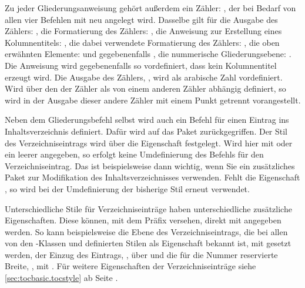 Zu jeder Gliederungsanweisung gehört außerdem ein Zähler: , der
bei Bedarf von allen vier Befehlen mit  neu angelegt
wird. Dasselbe gilt für die Ausgabe des Zählers: , die
Formatierung des Zählers: , die Anweisung zur
Erstellung eines Kolumnentitels: , die dabei
verwendete Formatierung des Zählers: , die oben
erwähnten Elemente:  und gegebenenfalls
, die nummerische Gliederungsebene:
. Die Anweisung  wird
gegebenenfalls so vordefiniert, dass kein Kolumnentitel erzeugt wird. Die
Ausgabe des Zählers, , wird als arabische Zahl
vordefiniert. Wird über den   der
Zähler als von einem anderen Zähler abhängig definiert, so wird in der Ausgabe
dieser andere Zähler mit einem Punkt getrennt vorangestellt.

Neben dem Gliederungsbefehl selbst wird auch ein Befehl für
einen Eintrag ins Inhaltsverzeichnis definiert. Dafür wird auf das Paket
\hyperref[cha:tocbasic]{}%
zurückgegriffen. Der Stil des Verzeichniseintrags wird über die Eigenschaft
 festgelegt. Wird hier mit  oder
 ein leerer  angegeben, so erfolgt
keine Umdefinierung des Befehls für den Verzeichniseintrag. Das ist
beispielsweise dann wichtig, wenn Sie ein zusätzliches Paket zur Modifikation
des Inhaltsverzeichnisses verwenden. Fehlt die Eigenschaft ,
so wird bei der Umdefinierung der bisherige Stil erneut verwendet.

Unterschiedliche Stile für Verzeichniseinträge haben
unterschiedliche zusätzliche Eigenschaften. Diese können, mit dem Präfix
 versehen, direkt mit angegeben werden. So kann beispielsweise die
Ebene des Verzeichniseintrags, die bei allen von den \KOMAScript-Klassen und
\hyperref[cha:tocbasic]{} definierten Stilen als Eigenschaft
 bekannt ist, mit  gesetzt werden, der Einzug
des Eintrags, , über  und die für die Nummer
reservierte Breite, , mit . Für weitere
Eigenschaften der Verzeichniseinträge siehe \autoref{sec:tocbasic.tocstyle} ab
Seite .

